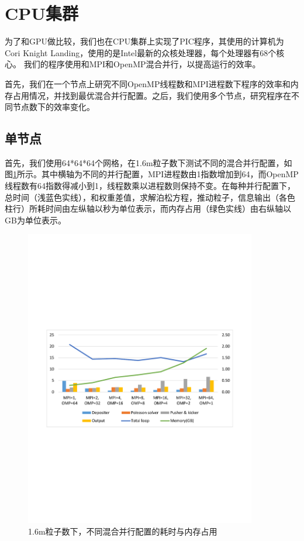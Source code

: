 \section{CPU集群}
为了和GPU做比较，我们也在CPU集群上实现了PIC程序，其使用的计算机为Cori Knight Landing，使用的是Intel最新的众核处理器，每个处理器有68个核心。
我们的程序使用和MPI和OpenMP混合并行，以提高运行的效率。

首先，我们在一个节点上研究不同OpenMP线程数和MPI进程数下程序的效率和内存占用情况，并找到最优混合并行配置。之后，我们使用多个节点，研究程序在不同节点数下的效率变化。

\subsection{单节点}
首先，我们使用64*64*64个网格，在1.6m粒子数下测试不同的混合并行配置，如图\ref{fig:PIC_speedup_Cori_1node_1_6m}所示。其中横轴为不同的并行配置，MPI进程数由1指数增加到64，而OpenMP线程数有64指数得减小到1，线程数乘以进程数则保持不变。在每种并行配置下，总时间（浅蓝色实线），和权重差值，求解泊松方程，推动粒子，信息输出（各色柱行）所耗时间由左纵轴以秒为单位表示，而内存占用（绿色实线）由右纵轴以GB为单位表示。

\begin{figure}[!htb]
  \centering
  \includegraphics[width=0.9\textwidth]{Img/PIC_speedup_Cori_1node_1_6m.pdf}
  \caption{1.6m粒子数下，不同混合并行配置的耗时与内存占用}
  \label{fig:PIC_speedup_Cori_1node_1_6m}
\end{figure}

